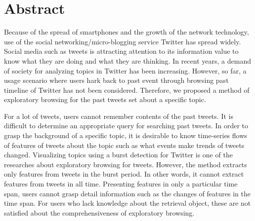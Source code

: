 \chapter*{Abstract}
\label{chap:Abstract-e}

Because of the spread of smartphones and the growth of the network technology, use of the social networking/micro-blogging service Twitter has spread widely. 
Social media such as tweets is attracting attention to its information value to know what they are doing and what they are thinking. 
In recent years, a demand of society for analyzing topics in Twitter has been increasing.
However, so far, a usage scenario where users hark back to past event through browsing past timeline of Twitter has not been considered. 
Therefore, we proposed a method of exploratory browsing for the past tweets set about a specific topic. 

For a lot of tweets,  users cannot remember contents of the past tweets. It is difficult to determine an appropriate query for searching past tweets.
In order to grasp the background of a specific topic, it is desirable to know time-series flows of features of tweets about the topic such as what events make trends of tweets changed.
Visualizing topics using a burst detection for Twitter is one of the researches about exploratory browsing for tweets.  
However, the method extracts only features from tweets in the burst period. In other words, it cannot extract features from tweets in all time.   
Presenting  features in only a particular time span, users cannot grasp detail information such as the changes of features in the time span.
For users who lack knowledge about the retrieval object, these are not satisfied about the comprehensiveness of exploratory browsing. 

